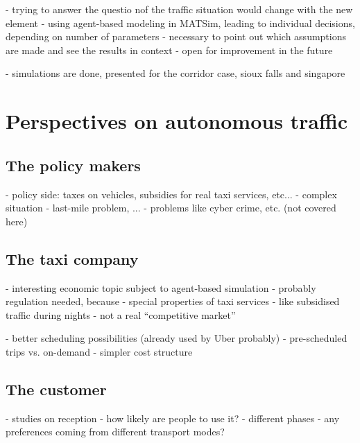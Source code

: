 \documentclass[10pt,a4paper,draft]{report}
\begin{document}
- trying to answer the questio nof the traffic situation would change with the new element
- using agent-based modeling in MATSim, leading to individual decisions, depending on number of parameters
- necessary to point out which assumptions are made and see the results in context
- open for improvement in the future

- simulations are done, presented for the corridor case, sioux falls and singapore
\fi

\chapter{Perspectives on autonomous traffic}

\section{The policy makers}

- policy side: taxes on vehicles, subsidies for real taxi services, etc...
- complex situation
- last-mile problem, ...
- problems like cyber crime, etc. (not covered here)

\section{The taxi company}


- interesting economic topic subject to agent-based simulation
- probably regulation needed, because
	- special properties of taxi services
	- like subsidised traffic during nights
	- not a real ``competitive market''


- better scheduling possibilities (already used by Uber probably)
- pre-scheduled trips vs. on-demand
- simpler cost structure

\section{The customer}

- studies on reception
- how likely are people to use it?
- different phases
- any preferences coming from different transport modes?
\end{document}
